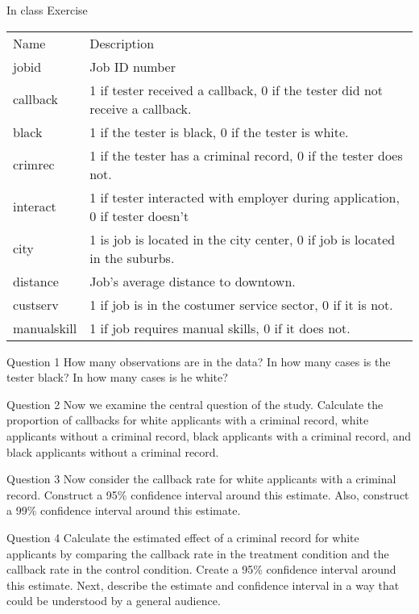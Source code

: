\documentclass[presentation]{beamer}
\begin{document}
\begin{frame}[shrink=30,label={sec:org93a8a91}]{In class Exercise}
\begin{center}
\begin{tabular}{ll}
Name & Description\\
jobid & Job ID number\\
callback & 1 if tester received a callback, 0 if the tester did not receive a callback.\\
black & 1 if the tester is black, 0 if the tester is white.\\
crimrec & 1 if the tester has a criminal record, 0 if the tester does not.\\
interact & 1 if tester interacted with employer during application, 0 if tester doesn’t\\
city & 1 is job is located in the city center, 0 if job is located in the suburbs.\\
distance & Job’s average distance to downtown.\\
custserv & 1 if job is in the costumer service sector, 0 if it is not.\\
manualskill & 1 if job requires manual skills, 0 if it does not.\\
\end{tabular}
\end{center}
\end{frame}


\begin{frame}[label={sec:org441a67c}]{Question 1}
How many observations are in the data? In how many cases is the tester black? In how many cases is he white?
\end{frame}

\begin{frame}[label={sec:orga994d4f}]{Question 2}
Now we examine the central question of the study. Calculate the proportion of callbacks for white applicants with a criminal record, white applicants without a criminal record, black applicants with a criminal record, and black applicants without a criminal record.
\end{frame}

\begin{frame}[label={sec:orge35ed12}]{Question 3}
Now consider the callback rate for white applicants with a criminal record. Construct a 95\% confidence interval around this estimate. Also, construct a 99\% confidence interval around this estimate.
\end{frame}

\begin{frame}[label={sec:org658d4db}]{Question 4}
Calculate the estimated effect of a criminal record for white applicants by comparing the callback rate in the treatment condition and the callback rate in the control condition. Create a 95\% confidence interval around this estimate. Next, describe the estimate and confidence interval in a way that could be understood by a general audience.
\end{frame}
\end{document}
